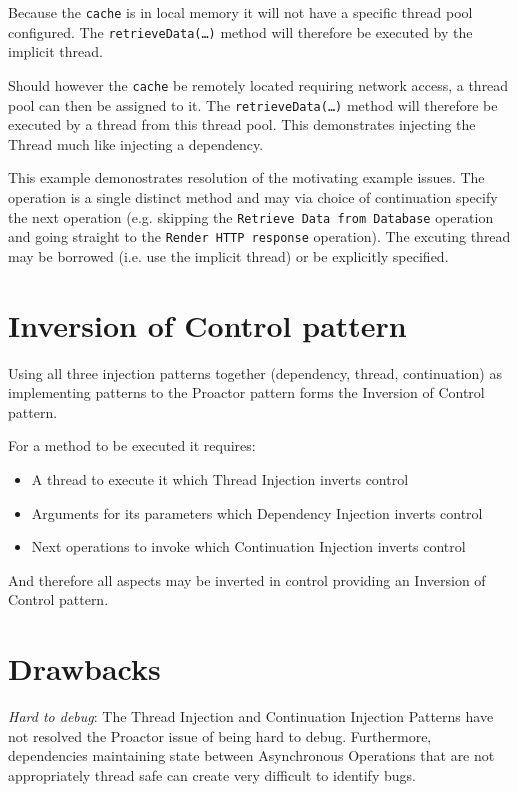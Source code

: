 \documentclass{article}
\begin{document}
Because the \texttt{cache} is in local memory it will not have a specific thread
pool configured.  The \texttt{retrieveData(\ldots)} method will therefore be
executed by the implicit thread.

Should however the \texttt{cache} be remotely located requiring network access,
a thread pool can then be assigned to it.  The \texttt{retrieveData(\ldots)}
method will therefore be executed by a thread from this thread pool.  This
demonstrates injecting the Thread much like injecting a dependency.

This example demonostrates resolution of the motivating example issues.  The
operation is a single distinct method and may via choice of continuation specify
the next operation (e.g. skipping the \texttt{Retrieve Data from Database}
operation and going straight to the \texttt{Render HTTP response} operation).
The excuting thread may be borrowed (i.e. use the implicit thread) or be
explicitly specified.


\section{Inversion of Control pattern}

Using all three injection patterns together (dependency, thread, continuation)
as implementing patterns to the Proactor pattern forms the Inversion of Control
pattern.

For a method to be executed it requires:
\begin{itemize}
  \item A thread to execute it which Thread Injection inverts control
  \item Arguments for its parameters which Dependency Injection inverts control
  \item Next operations to invoke which Continuation Injection inverts control
\end{itemize}

And therefore all aspects may be inverted in control providing an Inversion of
Control pattern.


\section{Drawbacks}

\emph{Hard to debug}: The Thread Injection and Continuation Injection Patterns
have not resolved the Proactor issue of being hard to debug.  Furthermore,
dependencies maintaining state between Asynchronous Operations that are not
appropriately thread safe can create very difficult to identify bugs.
\end{document}
